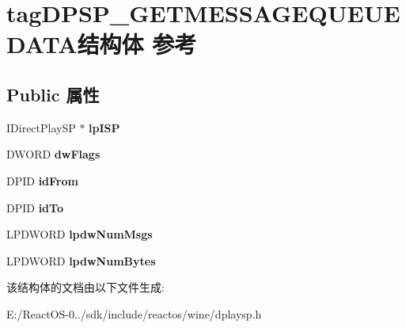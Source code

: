 \hypertarget{structtag_d_p_s_p___g_e_t_m_e_s_s_a_g_e_q_u_e_u_e_d_a_t_a}{}\section{tag\+D\+P\+S\+P\+\_\+\+G\+E\+T\+M\+E\+S\+S\+A\+G\+E\+Q\+U\+E\+U\+E\+D\+A\+T\+A结构体 参考}
\label{structtag_d_p_s_p___g_e_t_m_e_s_s_a_g_e_q_u_e_u_e_d_a_t_a}
\subsection*{Public 属性}
\begin{DoxyCompactItemize}
\item 
\mbox{\label{structtag_d_p_s_p___g_e_t_m_e_s_s_a_g_e_q_u_e_u_e_d_a_t_a_a5732411538b97853e9dfe5cf63f69d94}} 
I\+Direct\+Play\+SP $\ast$ {\bfseries lp\+I\+SP}
\item 
\mbox{\label{structtag_d_p_s_p___g_e_t_m_e_s_s_a_g_e_q_u_e_u_e_d_a_t_a_af6da8965614358d2bcbe0e9f1d521710}} 
D\+W\+O\+RD {\bfseries dw\+Flags}
\item 
\mbox{\label{structtag_d_p_s_p___g_e_t_m_e_s_s_a_g_e_q_u_e_u_e_d_a_t_a_ac4d3c7991395dd297b0b010c1049317c}} 
D\+P\+ID {\bfseries id\+From}
\item 
\mbox{\label{structtag_d_p_s_p___g_e_t_m_e_s_s_a_g_e_q_u_e_u_e_d_a_t_a_a162d4e2aab400811e80a4c4b3d1dc3d3}} 
D\+P\+ID {\bfseries id\+To}
\item 
\mbox{\label{structtag_d_p_s_p___g_e_t_m_e_s_s_a_g_e_q_u_e_u_e_d_a_t_a_ad8b519884337d1402a00e2008e37874d}} 
L\+P\+D\+W\+O\+RD {\bfseries lpdw\+Num\+Msgs}
\item 
\mbox{\label{structtag_d_p_s_p___g_e_t_m_e_s_s_a_g_e_q_u_e_u_e_d_a_t_a_a840dbee6e04c75b4e136e637560c763d}} 
L\+P\+D\+W\+O\+RD {\bfseries lpdw\+Num\+Bytes}
\end{DoxyCompactItemize}


该结构体的文档由以下文件生成\+:\begin{DoxyCompactItemize}
\item 
E\+:/\+React\+O\+S-\/0../sdk/include/reactos/wine/dplaysp.\+h\end{DoxyCompactItemize}
